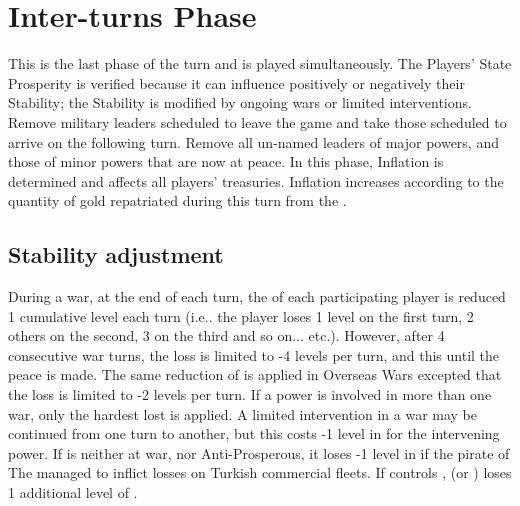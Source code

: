 \chapter{Inter-turns Phase}\label{chapter:Inter}

\InterPhase


This is the last phase of the turn and is played simultaneously.  The Players'
State Prosperity is verified because it can influence positively or negatively
their Stability; the Stability is modified by ongoing wars or limited
interventions.  Remove military leaders scheduled to leave the game and take
those scheduled to arrive on the following turn.  Remove all un-named leaders
of major powers, and those of minor powers that are now at peace.  In this
phase, Inflation is determined and affects all players' treasuries. Inflation
increases according to the quantity of gold repatriated during this turn from
the \ROTW.
\aparag[Sequence.]
\InterDetails



\section{Stability adjustment}

During a war, at the end of each turn, the \STAB of each participating player
is reduced 1 cumulative level each turn (i.e.. the player loses 1 level on the
first turn, 2 others on the second, 3 on the third and so
on... etc.). However, after 4 consecutive war turns, the loss is limited to -4
levels per turn, and this until the peace is made.
The same reduction of \STAB is applied in Overseas Wars excepted that the loss
is limited to -2 levels per turn.
 If a power is involved in more than one war, only the
hardest lost is applied.
A limited intervention in a war may be continued from one turn to another, but
this costs -1 level in \STAB for the intervening power.
If \TUR is neither at war, nor Anti-Prosperous, it loses -1 level in \STAB if
the pirate of The  managed to inflict losses on Turkish
commercial fleets.
\aparag[Vienna]
If \TUR controls , \HAB (\SPA or \AUS) loses 1 additional level
of \STAB.





